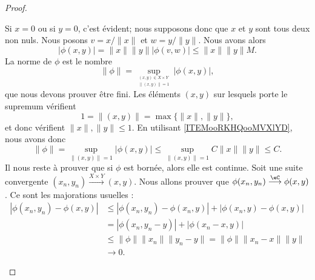 \begin{proof}
\begin{subproof}
        Si \( x=0\) ou si \( y=0\), c'est évident; nous supposons donc que \( x\) et \( y\) sont tous deux non nuls. Nous posons \( v=x/\| x \|\) et \( w=y/\| y \|\). Nous avons alors
        \begin{equation}
            | \phi(x,y) |=\| x \|\| y \| |\phi(v,w) |\leq \| x \|\| y \|M.
        \end{equation}
        \spitem[\ref{ITEMooRKHQooMVXlYD} \( \Rightarrow\) \ref{ITEMooLWDCooLIGVDs}]
        La norme de \( \phi\) est le nombre
        \begin{equation}
            \| \phi \|=\sup_{_{\substack{(x,y)\in X\times Y\\\| (x,y) \|=1}}}| \phi(x,y) |,
        \end{equation}
        que nous devons prouver être fini. Les éléments \( (x,y)\) sur lesquels porte le supremum vérifient
        \begin{equation}
            1=\| (x,y) \|=\max\{ \| x \|,\| y \| \},
        \end{equation}
        et donc vérifient \( \| x \|,\| y \|\leq 1\). En utilisant \ref{ITEMooRKHQooMVXlYD}, nous avons donc
        \begin{equation}
            \| \phi \|=\sup_{\| (x,y) \|=1}| \phi(x,y) |\leq  \sup_{\| (x,y) \|=1} C\| x \|\| y \|\leq C.
        \end{equation}
        \spitem[\ref{ITEMooLWDCooLIGVDs} \( \Rightarrow\) \ref{ITEMooWMFBooOWPzgP}]
        Il nous reste à prouver que si \( \phi\) est bornée, alors elle est continue. Soit une suite convergente \( (x_n,y_n)\stackrel{X\times Y}{\longrightarrow}(x,y)\). Nous allons prouver que \( \phi(x_n,y_n)\stackrel{\eC}{\longrightarrow}\phi(x,y)\). Ce sont les majorations usuelles :
        \begin{subequations}
            \begin{align}
                | \phi(x_n,y_n)-\phi(x,y) |&\leq | \phi(x_n,y_n)-\phi(x_n,y) |+| \phi(x_n,y)-\phi(x,y) |\\
                &=| \phi(x_n,y_n-y) |+| \phi(x_n-x,y) |\\
                &\leq \| \phi \|\| x_n \|\| y_n-y \|=\| \phi \|\| x_n-x \|\| y \|\\
                &\to 0.
            \end{align}
        \end{subequations}
    \end{subproof}


\end{proof}

